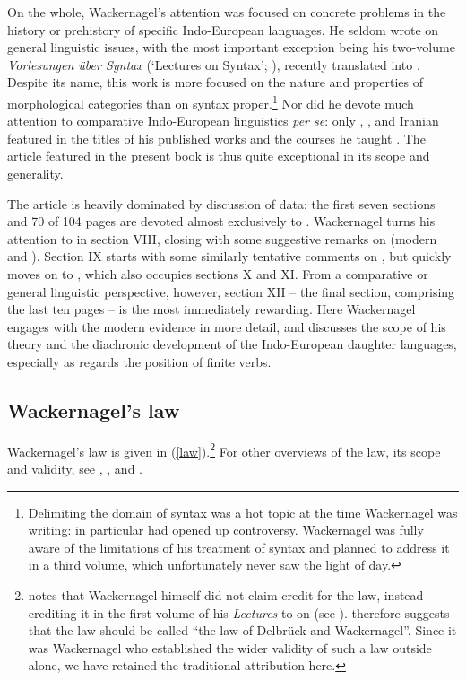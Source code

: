 On the whole, Wackernagel's attention was focused on concrete problems in the history or prehistory of specific Indo-European languages. He seldom wrote on general linguistic issues, with the most important exception being his two-volume \emph{Vorlesungen über Syntax} (`Lectures on Syntax'; \citeyear{Wackernagel1920,Wackernagel1924}), recently translated into  \citep{Langslow2009}. Despite its name, this work is more focused on the nature and properties of morphological categories than on syntax proper.\footnote{Delimiting the domain of syntax was a hot topic at the time Wackernagel was writing: \citet{Ries1894} in particular had opened up controversy. Wackernagel was fully aware of the limitations of his treatment of syntax and planned to address it in a third volume, which unfortunately never saw the light of day.}
Nor did he devote much attention to comparative Indo-European linguistics \emph{per se}: only , ,  and Iranian featured in the titles of his published works and the courses he taught \citep[xi]{Langslow2009}. The article featured in the present book \citep{Wackernagel1892} is thus quite exceptional in its scope and generality.

The article is heavily dominated by discussion of  data: the first seven sections and 70 of 104 pages are devoted almost exclusively to . Wackernagel turns his attention to  in section VIII, closing with some suggestive remarks on  (modern  and ). Section IX starts with some similarly tentative comments on , but quickly moves on to , which also occupies sections X and XI. From a comparative or general linguistic perspective, however, section XII -- the final section, comprising the last ten pages -- is the most immediately rewarding. Here Wackernagel engages with the modern  evidence in more detail, and discusses the scope of his theory and the diachronic development of the Indo-European daughter languages, especially as regards the position of finite verbs.

\subsection{Wackernagel's law}

Wackernagel's law is given in (\ref{law}).\footnote{\citet[218]{Collinge1985} notes that Wackernagel himself did not claim credit for the law, instead crediting it in the first volume of his \textit{Lectures} to \citet{Delbrueck1878} on  (see \citealp[57]{Langslow2009}). \citeauthor{Collinge1985} therefore suggests that the law should be called ``the law of Delbrück and Wackernagel''. Since it was Wackernagel who established the wider validity of such a law outside  alone, we have retained the traditional attribution here.} For other overviews of the law, its scope and validity, see \citet[218--219]{Collinge1985}, \citet{Krisch1990}, and \citet{Goldstein2014}.

